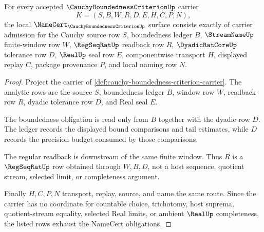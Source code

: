 \begin{theorem}
\label{thm:cauchy-boundedness-criterion-namecert-obligations}
For every accepted $\CauchyBoundednessCriterionUp$ carrier
$$
K=(S,B,W,R,D,E,H,C,P,N),
$$
the local $\NameCert_{\CauchyBoundednessCriterionUp}$ surface consists exactly of carrier admission for the Cauchy source row $S$, boundedness ledger $B$, $\StreamNameUp$ finite-window row $W$, $\RegSeqRatUp$ readback row $R$, $\DyadicRatCoreUp$ tolerance row $D$, $\RealUp$ seal row $E$, componentwise transport $H$, displayed replay $C$, package provenance $P$, and local naming row $N$.
\end{theorem}
\begin{proof}
Project the carrier of \autoref{def:cauchy-boundedness-criterion-carrier}. The analytic rows are the source $S$, boundedness ledger $B$, window row $W$, readback row $R$, dyadic tolerance row $D$, and Real seal $E$.

The boundedness obligation is read only from $B$ together with the dyadic row $D$. The ledger records the displayed bound comparisons and tail estimates, while $D$ records the precision budget consumed by those comparisons.

The regular readback is downstream of the same finite window. Thus $R$ is a $\RegSeqRatUp$ row obtained through $W,B,D$, not a host sequence, quotient stream, selected limit, or completeness argument.

Finally $H,C,P,N$ transport, replay, source, and name the same route. Since the carrier has no coordinate for countable choice, trichotomy, host suprema, quotient-stream equality, selected Real limits, or ambient $\RealUp$ completeness, the listed rows exhaust the NameCert obligations.
\end{proof}

